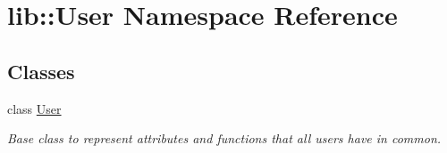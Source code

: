 \hypertarget{namespacelib_1_1User}{\section{lib\-:\-:\-User \-Namespace \-Reference}
\label{namespacelib_1_1User}
}
\subsection*{\-Classes}
\begin{DoxyCompactItemize}
\item 
class \hyperlink{classlib_1_1User_1_1User}{\-User}
\begin{DoxyCompactList}\small\item\em \-Base class to represent attributes and functions that all users have in common. \end{DoxyCompactList}\end{DoxyCompactItemize}
